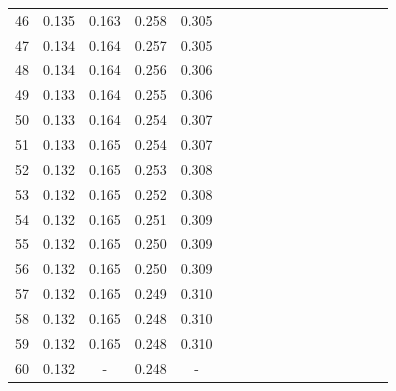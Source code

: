 \documentclass{report}
\begin{document}
\begin{table}
\begin{tabular}{|c|cccc|cccc|cccc|cccc|}
46 & 0.135 & 0.163 & 0.258 & 0.305 & & & & & & & & & & & &\\
47 & 0.134 & 0.164 & 0.257 & 0.305 & & & & & & & & & & & &\\
48 & 0.134 & 0.164 & 0.256 & 0.306 & & & & & & & & & & & &\\
49 & 0.133 & 0.164 & 0.255 & 0.306 & & & & & & & & & & & &\\
50 & 0.133 & 0.164 & 0.254 & 0.307 & & & & & & & & & & & &\\
51 & 0.133 & 0.165 & 0.254 & 0.307 & & & & & & & & & & & &\\
52 & 0.132 & 0.165 & 0.253 & 0.308 & & & & & & & & & & & &\\
53 & 0.132 & 0.165 & 0.252 & 0.308 & & & & & & & & & & & &\\
54 & 0.132 & 0.165 & 0.251 & 0.309 & & & & & & & & & & & &\\
55 & 0.132 & 0.165 & 0.250 & 0.309 & & & & & & & & & & & &\\
56 & 0.132 & 0.165 & 0.250 & 0.309 & & & & & & & & & & & &\\
57 & 0.132 & 0.165 & 0.249 & 0.310 & & & & & & & & & & & &\\
58 & 0.132 & 0.165 & 0.248 & 0.310 & & & & & & & & & & & &\\
59 & 0.132 & 0.165 & 0.248 & 0.310 & & & & & & & & & & & &\\
60 & 0.132 &   -   & 0.248 &   -   & & & & & & & & & & & &\\
\hline
\end{tabular}
\end{table}
\end{document}
